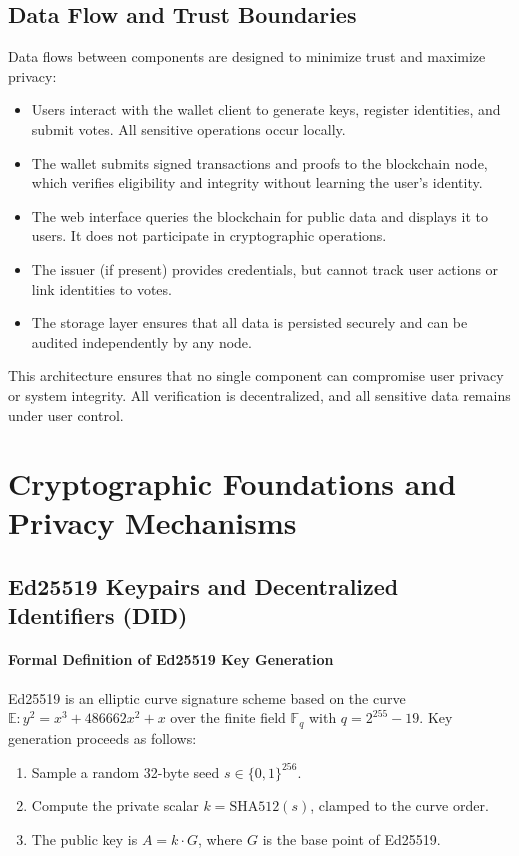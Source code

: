 \documentclass[12pt,a4paper]{report}
\begin{document}
\subsection{Data Flow and Trust Boundaries}
Data flows between components are designed to minimize trust and maximize privacy:
\begin{itemize}
  \item Users interact with the wallet client to generate keys, register identities, and submit votes. All sensitive operations occur locally.
  \item The wallet submits signed transactions and proofs to the blockchain node, which verifies eligibility and integrity without learning the user's identity.
  \item The web interface queries the blockchain for public data and displays it to users. It does not participate in cryptographic operations.
  \item The issuer (if present) provides credentials, but cannot track user actions or link identities to votes.
  \item The storage layer ensures that all data is persisted securely and can be audited independently by any node.
\end{itemize}

This architecture ensures that no single component can compromise user privacy or system integrity. All verification is decentralized, and all sensitive data remains under user control.

\section{Cryptographic Foundations and Privacy Mechanisms}
\subsection{Ed25519 Keypairs and Decentralized Identifiers (DID)}

\paragraph{Formal Definition of Ed25519 Key Generation}
Ed25519 is an elliptic curve signature scheme based on the curve $\mathbb{E}: y^2 = x^3 + 486662x^2 + x$ over the finite field $\mathbb{F}_q$ with $q = 2^{255} - 19$. Key generation proceeds as follows:
\begin{enumerate}
  \item Sample a random 32-byte seed $s \in \{0,1\}^{256}$.
  \item Compute the private scalar $k = \mathrm{SHA512}(s)$, clamped to the curve order.
  \item The public key is $A = k \cdot G$, where $G$ is the base point of Ed25519.
\end{enumerate}
\end{document}
